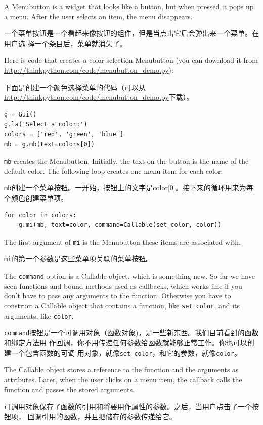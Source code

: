\documentclass[10pt]{book}
\begin{document}
\begin{CJK}{UTF8}{gbsn}
A Menubutton is a widget that looks like a button, but when pressed
it pops up a menu.  After the user selects an item, the menu
disappears.

一个菜单按钮是一个看起来像按钮的组件，但是当点击它后会弹出来一个菜单。在用户选
择一个条目后，菜单就消失了。

Here is code that creates a color selection Menubutton
(you can download it from \url{http://thinkpython.com/code/menubutton_demo.py}):

下面是创建一个颜色选择菜单的代码（可以从
\url{http://thinkpython.com/code/menubutton_demo.py}下载）。

\begin{verbatim}
g = Gui()
g.la('Select a color:')
colors = ['red', 'green', 'blue']
mb = g.mb(text=colors[0])
\end{verbatim}
%
{\tt mb} creates the Menubutton.  Initially, the text on the button is
the name of the default color.  The following loop creates one menu
item for each color:

{\tt mb}创建一个菜单按钮。一开始，按钮上的文字是color[0]。接下来的循环用来为每
个颜色创建菜单项。

\begin{verbatim}
for color in colors:
    g.mi(mb, text=color, command=Callable(set_color, color))
\end{verbatim}
%
The first argument of {\tt mi} is the Menubutton these items are
associated with.

{\tt mi}的第一个参数是这些菜单项关联的菜单按钮。

The {\tt command} option is a Callable object, which is something new.
So far we have seen functions and bound methods used as callbacks,
which works fine if you don't have to pass any arguments to
the function.  Otherwise you have to construct a Callable object
that contains a function, like \verb"set_color", and its arguments,
like {\tt color}.

{\tt command}按钮是一个可调用对象（函数对象)，是一些新东西。我们目前看到的函数和绑定方法用
作回调，你不用传递任何参数给函数就能够正常工作。你也可以创建一个包含函数的可调
用对象，就像\verb"set_color"，和它的参数，就像{\tt color}。

The Callable object stores a reference to the function and the
arguments as attributes.  Later, when the user clicks on a menu
item, the callback calls the function and passes the stored
arguments.

可调用对象保存了函数的引用和将要用作属性的参数。之后，当用户点击了一个按钮项，
回调引用的函数，并且把储存的参数传递给它。


\end{CJK}
\end{document}
